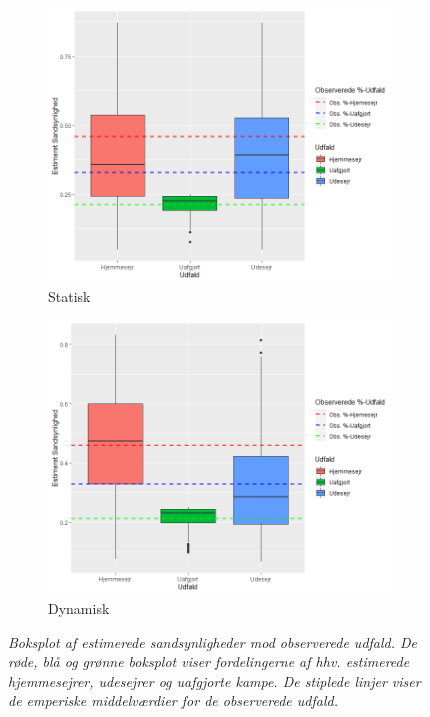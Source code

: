 \documentclass[11pt,a4paper]{article}
\begin{document}
\begin{figure}[h!]
  \centering
  \begin{subfigure}[b]{0.8\linewidth}
    \includegraphics[width=\linewidth]{EstSSHStatisk.png}
    \caption{Statisk}
    \label{fig:boxplotS}
  \end{subfigure}
  \begin{subfigure}[b]{0.8\linewidth}
    \includegraphics[width=\linewidth]{EstSSHDyn.png}
    \caption{Dynamisk}
    \label{fig:boxplotD}
  \end{subfigure}
  \caption{\textit{Boksplot af estimerede sandsynligheder mod observerede udfald. De røde, blå og grønne boksplot viser fordelingerne af hhv. estimerede hjemmesejrer, udesejrer og uafgjorte kampe. De stiplede linjer viser de emperiske middelværdier for de observerede udfald.}}
  \label{fig:boxplot}
\end{figure}
\end{document}
